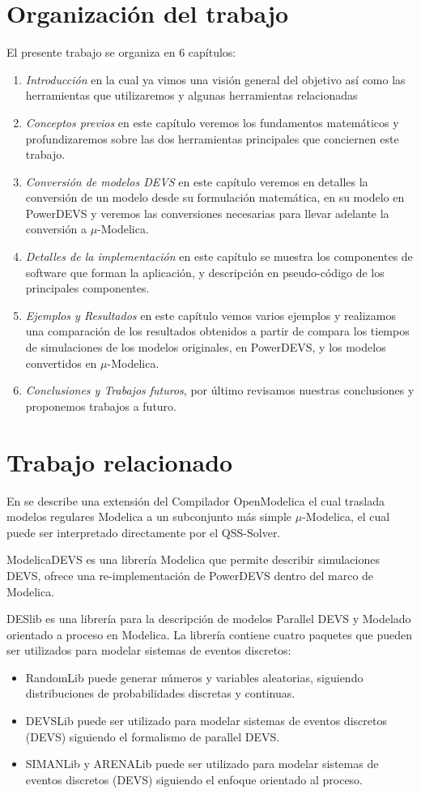 \section{Organización del trabajo}
El presente trabajo se organiza en 6 capítulos:
\begin{enumerate}
\item \emph{Introducción} en la cual ya vimos una visión general del objetivo así como las herramientas que utilizaremos y algunas herramientas relacionadas
\item \emph{Conceptos previos} en este capítulo veremos los fundamentos matemáticos y profundizaremos sobre las dos herramientas principales que conciernen este trabajo.
\item \emph{Conversión de modelos DEVS} en este capítulo veremos en detalles la conversión de un modelo desde su formulación matemática, en su modelo en PowerDEVS y veremos las conversiones necesarias para llevar adelante la conversión a $\mu$-Modelica.
\item \emph{Detalles de la implementación} en este capítulo se muestra los componentes de software que forman la aplicación, y descripción en pseudo-código de los principales componentes.
\item \emph{Ejemplos y Resultados} en este capítulo vemos varios ejemplos y realizamos una comparación de los resultados obtenidos a partir de compara los tiempos de simulaciones de los modelos originales, en PowerDEVS, y los modelos convertidos en $\mu$-Modelica.
\item \emph{Conclusiones y Trabajos futuros}, por último revisamos nuestras conclusiones y proponemos trabajos a futuro.
\end{enumerate}

\section{Trabajo relacionado}
En \cite{Ber12} se describe una extensión del Compilador OpenModelica el cual traslada modelos regulares Modelica a un subconjunto más simple $\mu$-Modelica, el cual puede ser interpretado directamente por el QSS-Solver.


ModelicaDEVS \cite{Beltrame06quantisedstate} es una librería Modelica que permite describir simulaciones DEVS, ofrece una re-implementación de PowerDEVS dentro del marco de Modelica.

DESlib \cite{Sanz09paralleldevs} es una librería para la descripción de modelos Parallel DEVS y Modelado orientado a proceso en Modelica.
La librería contiene cuatro paquetes que pueden ser utilizados para modelar sistemas de eventos discretos:
\begin{itemize}
\item RandomLib puede generar números y variables aleatorias, siguiendo distribuciones de probabilidades discretas y continuas.
\item DEVSLib puede ser utilizado para modelar sistemas de eventos discretos (DEVS) siguiendo el formalismo de parallel DEVS.
\item SIMANLib y ARENALib puede ser utilizado para modelar sistemas de eventos discretos (DEVS) siguiendo el enfoque orientado al proceso.
\end{itemize}

